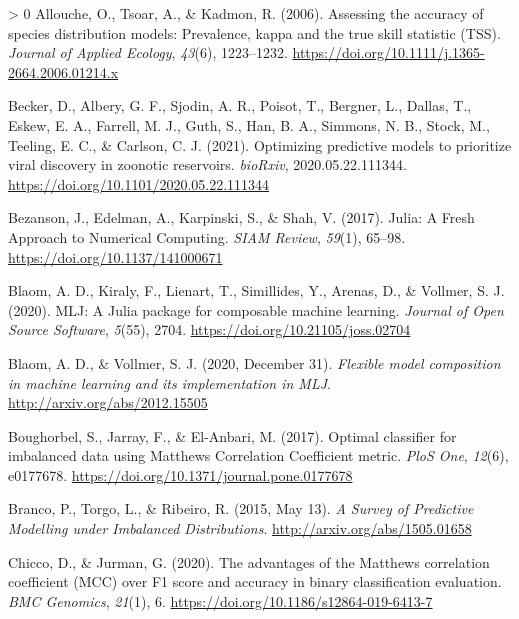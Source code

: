 \documentclass[10pt,oneside]{article}
\newlength{\cslhangindent}
\newenvironment{CSLReferences}[3] %
 {%
  \setlength{\parindent}{0pt}
  \ifodd #1 \everypar{\setlength{\hangindent}{\cslhangindent}}\ignorespaces\fi
  \ifnum #2 > 0
  \setlength{\parskip}{#2\baselineskip}
  \fi
 }%
 {}
\begin{document}
\hypertarget{refs}{}
\begin{CSLReferences}{1}{0}
\leavevmode\hypertarget{ref-Allouche2006AssAcc}{}%
Allouche, O., Tsoar, A., \& Kadmon, R. (2006). Assessing the accuracy of
species distribution models: Prevalence, kappa and the true skill
statistic (TSS). \emph{Journal of Applied Ecology}, \emph{43}(6),
1223--1232. \url{https://doi.org/10.1111/j.1365-2664.2006.01214.x}

\leavevmode\hypertarget{ref-Becker2021OptPre}{}%
Becker, D., Albery, G. F., Sjodin, A. R., Poisot, T., Bergner, L.,
Dallas, T., Eskew, E. A., Farrell, M. J., Guth, S., Han, B. A., Simmons,
N. B., Stock, M., Teeling, E. C., \& Carlson, C. J. (2021). Optimizing
predictive models to prioritize viral discovery in zoonotic reservoirs.
\emph{bioRxiv}, 2020.05.22.111344.
\url{https://doi.org/10.1101/2020.05.22.111344}

\leavevmode\hypertarget{ref-Bezanson2017JulFre}{}%
Bezanson, J., Edelman, A., Karpinski, S., \& Shah, V. (2017). Julia: A
Fresh Approach to Numerical Computing. \emph{SIAM Review}, \emph{59}(1),
65--98. \url{https://doi.org/10.1137/141000671}

\leavevmode\hypertarget{ref-Blaom2020MljJul}{}%
Blaom, A. D., Kiraly, F., Lienart, T., Simillides, Y., Arenas, D., \&
Vollmer, S. J. (2020). MLJ: A Julia package for composable machine
learning. \emph{Journal of Open Source Software}, \emph{5}(55), 2704.
\url{https://doi.org/10.21105/joss.02704}

\leavevmode\hypertarget{ref-Blaom2020FleMod}{}%
Blaom, A. D., \& Vollmer, S. J. (2020, December 31). \emph{Flexible
model composition in machine learning and its implementation in MLJ}.
\url{http://arxiv.org/abs/2012.15505}

\leavevmode\hypertarget{ref-Boughorbel2017OptCla}{}%
Boughorbel, S., Jarray, F., \& El-Anbari, M. (2017). Optimal classifier
for imbalanced data using Matthews Correlation Coefficient metric.
\emph{PloS One}, \emph{12}(6), e0177678.
\url{https://doi.org/10.1371/journal.pone.0177678}

\leavevmode\hypertarget{ref-Branco2015SurPre}{}%
Branco, P., Torgo, L., \& Ribeiro, R. (2015, May 13). \emph{A Survey of
Predictive Modelling under Imbalanced Distributions}.
\url{http://arxiv.org/abs/1505.01658}

\leavevmode\hypertarget{ref-Chicco2020AdvMat}{}%
Chicco, D., \& Jurman, G. (2020). The advantages of the Matthews
correlation coefficient (MCC) over F1 score and accuracy in binary
classification evaluation. \emph{BMC Genomics}, \emph{21}(1), 6.
\url{https://doi.org/10.1186/s12864-019-6413-7}


\end{CSLReferences}
\end{document}
